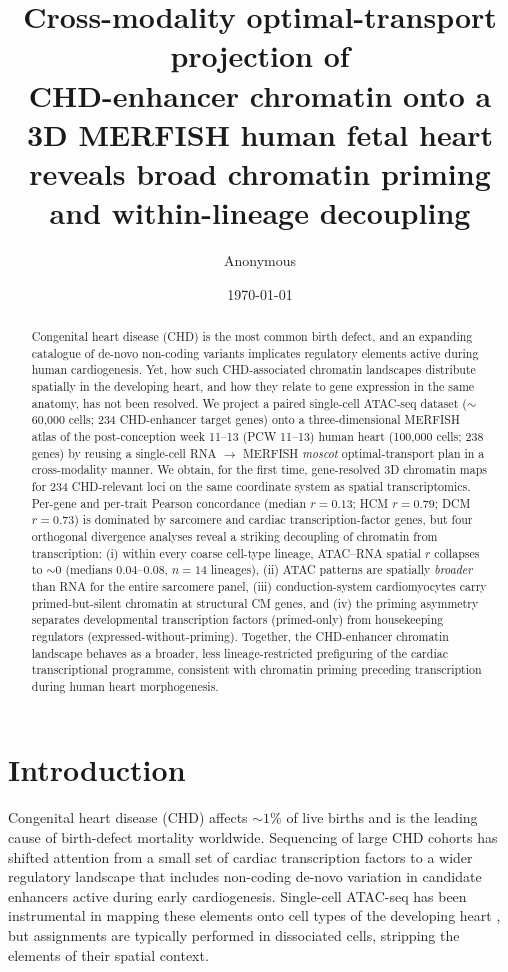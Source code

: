 \documentclass[11pt,a4paper]{article}
\title{\textbf{Cross-modality optimal-transport projection of\\
CHD-enhancer chromatin onto a 3D MERFISH human fetal heart\\
reveals broad chromatin priming and within-lineage decoupling}}
\author[1]{Anonymous}
\affil[1]{PCW12 Human Fetal Heart Reproducibility Study}
\date{\today}
\begin{document}
\maketitle

\begin{abstract}
\noindent
Congenital heart disease (CHD) is the most common birth defect, and an expanding
catalogue of de-novo non-coding variants implicates regulatory elements active
during human cardiogenesis. Yet, how such CHD-associated chromatin landscapes
distribute spatially in the developing heart, and how they relate to gene
expression in the same anatomy, has not been resolved. We project a paired
single-cell ATAC-seq dataset (\(\sim\)60{,}000 cells; 234 CHD-enhancer
target genes) onto a three-dimensional MERFISH atlas of the post-conception
week 11--13 (PCW 11--13) human heart (100{,}000 cells; 238 genes) by reusing a
single-cell RNA \(\rightarrow\) MERFISH \emph{moscot} optimal-transport plan in
a cross-modality manner. We obtain, for the first time, gene-resolved 3D
chromatin maps for 234 CHD-relevant loci on the same coordinate system as
spatial transcriptomics. Per-gene and per-trait Pearson concordance
(median \(r=0.13\); HCM \(r=0.79\); DCM \(r=0.73\)) is dominated by
sarcomere and cardiac transcription-factor genes, but four orthogonal
divergence analyses reveal a striking decoupling of chromatin from
transcription: (i) within every coarse cell-type lineage, ATAC--RNA
spatial \(r\) collapses to \(\sim\!0\) (medians 0.04--0.08, \(n=14\) lineages),
(ii) ATAC patterns are spatially \emph{broader} than RNA for the entire
sarcomere panel, (iii) conduction-system cardiomyocytes carry primed-but-silent
chromatin at structural CM genes, and (iv) the priming asymmetry separates
developmental transcription factors (primed-only) from housekeeping
regulators (expressed-without-priming). Together, the CHD-enhancer
chromatin landscape behaves as a broader, less lineage-restricted
prefiguring of the cardiac transcriptional programme, consistent with
chromatin priming preceding transcription during human heart morphogenesis.
\end{abstract}

\section{Introduction}

Congenital heart disease (CHD) affects \(\sim\!1\%\) of live births and is the
leading cause of birth-defect mortality worldwide. Sequencing of large CHD
cohorts \citep{jin2017chd,homsy2015chd,sifrim2016chd} has shifted attention
from a small set of cardiac transcription factors
\citep{bruneau2008chdgenetics} to a wider regulatory landscape that includes
non-coding de-novo variation in candidate enhancers active during early
cardiogenesis. Single-cell ATAC-seq has been instrumental in mapping these
elements onto cell types of the developing heart
\citep{buenrostro2015scatac,cusanovich2015sciatac,ameen2022cardiogenesis},
but assignments are typically performed in dissociated cells, stripping the
elements of their spatial context.
\end{document}
